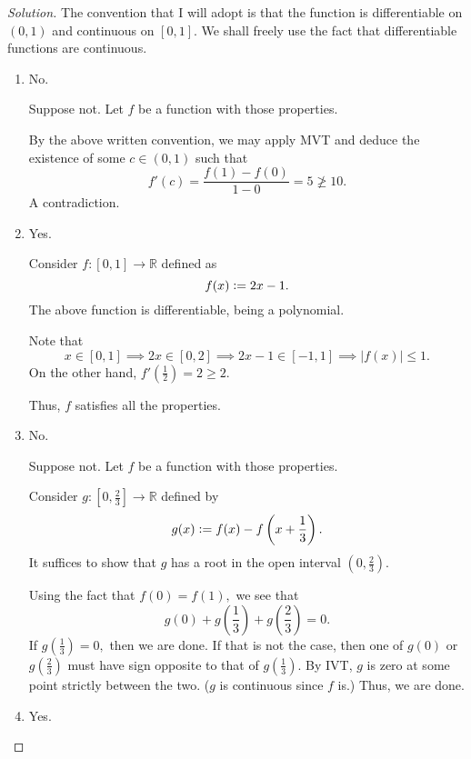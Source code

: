 \documentclass[12pt]{article}
\theoremstyle{definition}
\newenvironment{soln}{\begin{proof}[Solution]}{\end{proof}}
\newcommand{\md}[1]{\left\lvert #1 \right\lvert}
\begin{document}
\begin{soln}
	The convention that I will adopt is that the function is differentiable on $(0, 1)$ and continuous on $[0, 1].$ We shall freely use the fact that differentiable functions are continuous.
	\begin{enumerate}
		\item {\color{red}No}. 

		Suppose not. Let $f$ be a function with those properties.

		By the above written convention, we may apply MVT and deduce the existence of some $c \in (0, 1)$ such that
		\begin{equation*} 
			f'(c) = \dfrac{f(1) - f(0)}{1 - 0} = 5 \not\ge 10.
		\end{equation*}
		A contradiction.
		\item {\color{blue}Yes}.

		Consider $f:[0, 1] \to \mathbb{R}$ defined as
		\begin{equation*} 
			f(x) \vcentcolon= 2x - 1.
		\end{equation*}
		The above function is differentiable, being a polynomial.

		Note that
		\begin{equation*} 
			x \in [0, 1] \implies 2x \in [0, 2] \implies 2x - 1 \in [-1, 1] \implies \md{f(x)} \le 1.
		\end{equation*}
		On the other hand, $f'\left(\frac{1}{2}\right) = 2 \ge 2.$

		Thus, $f$ satisfies all the properties.
		\item {\color{red}No}. 

		Suppose not. Let $f$ be a function with those properties.

		Consider $g:\left[0, \frac{2}{3}\right] \to \mathbb{R}$ defined by
		\begin{equation*} 
			g(x) \vcentcolon= f(x) - f\left(x + \frac{1}{3}\right).
		\end{equation*}
		It suffices to show that $g$ has a root in the open interval $\left(0, \frac{2}{3}\right).$

		Using the fact that $f(0) = f(1),$ we see that
		\begin{equation*} 
			g(0) + g\left(\frac{1}{3}\right) + g\left(\frac{2}{3}\right) = 0.
		\end{equation*}
		If $g\left(\frac{1}{3}\right) = 0,$ then we are done. If that is not the case, then one of $g(0)$ or $g\left(\frac{2}{3}\right)$ must have sign opposite to that of $g\left(\frac{1}{3}\right).$ By IVT, $g$ is zero at some point strictly between the two. ($g$ is continuous since $f$ is.) Thus, we are done.
		\item {\color{blue}Yes}.


\end{enumerate}
\end{soln}
\end{document}

